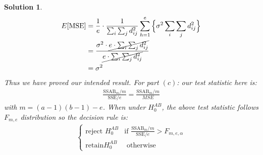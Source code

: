 \documentclass[11pt]{article}
\newtheorem{sol}{Solution}
\begin{document}
\begin{sol}
\begin{align*}
	E[\text{MSE}] &= \frac{1}{e}\cdot \frac{1}{\sum_i\sum_j d_{ij}^2}\sum_{h = 1}^e\Big\{\sigma^2\sum_i\sum_j d_{ij}^2\Big\}\\
	&= \frac{\sigma^2\cdot \cancel{e\cdot \sum_i\sum_j d^2_{ij}}}{\cancel{e\cdot \sum_i\sum_jd_{ij}^2}}\\
	&= \sigma^2
\end{align*}
Thus we have proved our intended result.\vskip 2mm
For part $(c)$:\vskip 2mm
our test statistic here is:
\begin{align*}
	\frac{\text{SSAB}_m/m}{\text{SSE}/e} = \frac{\text{SSAB}_m/m}{MSE}
\end{align*}
with $m = (a - 1)(b - 1) - e$. When under $H_0^{AB}$, the above test statistic follows $F_{m, e}$ distribution so the decision rule is:
\begin{align*}
	\left\{\begin{array}{ll} \text{reject } H_0^{AB} & \text{if }\frac{\text{SSAB}_m/m}{\text{SSE}/e} > F_{m, e, \alpha}\\ \text{retain} H_0^{AB} &  \text{ otherwise}\end{array}\right.
\end{align*}
\end{sol}
\end{document}
